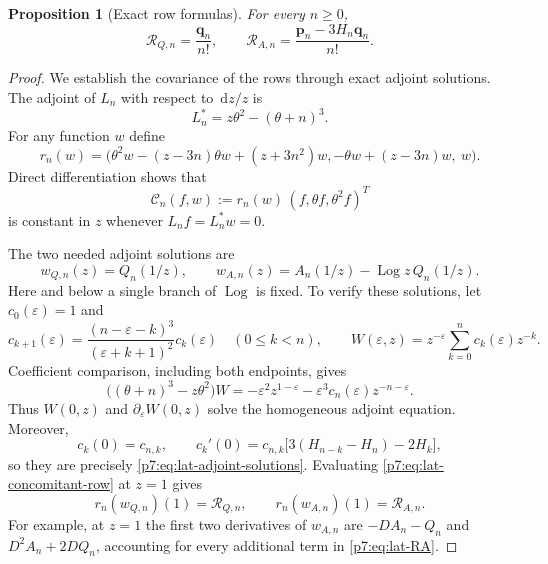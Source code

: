 \documentclass[11pt,a4paper]{article}
\newtheorem{proposition}[theorem]{Proposition}
\theoremstyle{definition}
\theoremstyle{remark}
\newcommand{\dd}{\,\mathrm d}
\DeclareMathOperator{\Log}{Log}
\numberwithin{equation}{section}
\begin{document}
\begin{proposition}[Exact row formulas]\label{p7:prop:lat-row-formulas}
For every $n\geq0$,
\begin{equation}\label{p7:eq:lat-row-result}
\mathcal R_{Q,n}=\frac{\mathbf q_n}{n!},\qquad
\mathcal R_{A,n}=\frac{\mathbf p_n-3H_n\mathbf q_n}{n!}.
\end{equation}
\end{proposition}

\begin{proof}
We establish the covariance of the rows through exact adjoint solutions.
The adjoint of $L_n$ with respect to $\dd z/z$ is
\[
L_n^*=z\theta^2-(\theta+n)^3.
\]
For any function $w$ define
\begin{equation}\label{p7:eq:lat-concomitant-row}
r_n(w)=\bigl(\theta^2w-(z-3n)\theta w+(z+3n^2)w,
             -\theta w+(z-3n)w,\ w\bigr).
\end{equation}
Direct differentiation shows that
\[
\mathcal C_n(f,w):=r_n(w)\,(f,\theta f,\theta^2f)^T
\]
is constant in $z$ whenever $L_nf=L_n^*w=0$.

The two needed adjoint solutions are
\begin{equation}\label{p7:eq:lat-adjoint-solutions}
w_{Q,n}(z)=Q_n(1/z),\qquad
w_{A,n}(z)=A_n(1/z)-\Log z\,Q_n(1/z).
\end{equation}
Here and below a single branch of $\Log$ is fixed.  To verify these
solutions, let $c_0(\varepsilon)=1$ and
\[
c_{k+1}(\varepsilon)
=\frac{(n-\varepsilon-k)^3}{(\varepsilon+k+1)^2}
 c_k(\varepsilon)\quad(0\leq k<n),\qquad
W(\varepsilon,z)=z^{-\varepsilon}
 \sum_{k=0}^n c_k(\varepsilon)z^{-k}.
\]
Coefficient comparison, including both endpoints, gives
\begin{equation}\label{p7:eq:lat-epsilon-residual}
\bigl((\theta+n)^3-z\theta^2\bigr)W
=-\varepsilon^2z^{1-\varepsilon}
 -\varepsilon^3c_n(\varepsilon)z^{-n-\varepsilon}.
\end{equation}
Thus $W(0,z)$ and $\partial_\varepsilon W(0,z)$ solve the homogeneous
adjoint equation.  Moreover,
\[
c_k(0)=c_{n,k},\qquad
c_k'(0)=c_{n,k}\bigl[3(H_{n-k}-H_n)-2H_k\bigr],
\]
so they are precisely \eqref{p7:eq:lat-adjoint-solutions}.  Evaluating
\eqref{p7:eq:lat-concomitant-row} at $z=1$ gives
\begin{equation}\label{p7:eq:lat-adjoint-rows}
r_n(w_{Q,n})(1)=\mathcal R_{Q,n},\qquad
r_n(w_{A,n})(1)=\mathcal R_{A,n}.
\end{equation}
For example, at $z=1$ the first two derivatives of $w_{A,n}$ are
$-DA_n-Q_n$ and $D^2A_n+2DQ_n$, accounting for every additional term
in \eqref{p7:eq:lat-RA}.


\end{proof}
\end{document}
